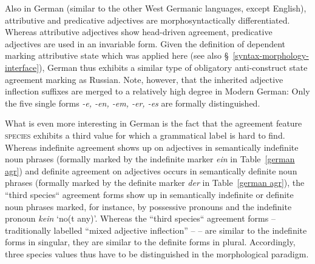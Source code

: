 Also in German (similar to the other West Germanic languages, except English), attributive and predicative adjectives are morphosyntactically differentiated. Whereas attributive adjectives show head\hyp{}driven agreement, predicative adjectives are used in an invariable form. Given the definition of dependent marking attributive state which was applied here (see also \S~\ref{syntax-morphology-interface}), German thus exhibits a similar type of obligatory anti\hyp{}construct state agreement marking as Russian. Note, however, that the inherited adjective inflection suffixes are merged to a relatively high degree in Modern German: Only the five single forms \textit{-e, -en, -em, -er, -es} are formally distinguished. 

What is even more interesting in German is the fact that the agreement feature \textsc{species} exhibits a third value for which a grammatical label is hard to find. Whereas indefinite agreement shows up on adjectives in semantically indefinite noun phrases (formally marked by the indefinite marker \textit{ein} in Table~\ref{german agr}) and definite agreement on adjectives occurs in semantically definite noun phrases (formally marked by the definite marker \textit{der} in Table~\ref{german agr}), the “third species“ agreement forms show up in semantically indefinite or definite noun phrases marked, for instance, by possessive pronouns and the indefinite pronoun \textit{kein} ‘no(t any)’. Whereas the “third species“ agreement forms – traditionally labelled “mixed adjective inflection” – \citep[cf.][244–245]{schafer2015a} – are similar to the indefinite forms in singular, they are similar to the definite forms in plural. Accordingly, three species values thus have to be distinguished in the morphological paradigm.

